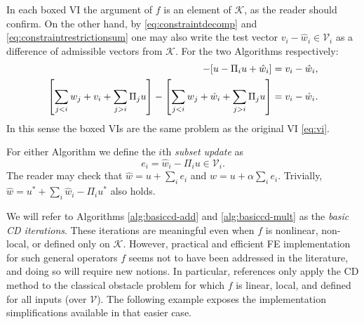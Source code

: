 \documentclass[letterpaper,final,12pt,reqno]{amsart}
\theoremstyle{cstyle}
\theoremstyle{cstyle*}
\theoremstyle{dstyle}
\numberwithin{equation}{section}
\numberwithin{figure}{section}
\numberwithin{table}{section}
\numberwithin{theorem}{section}
\newcommand{\cK}{\mathcal{K}}
\newcommand{\cV}{\mathcal{V}}
\begin{document}
In each boxed VI the argument of $f$ is an element of $\cK$, as the reader should confirm.  On the other hand, by \eqref{eq:constraintdecomp} and \eqref{eq:constraintrestrictionsum} one may also write the test vector $v_i - \hat w_i \in \cV_i$ as a difference of admissible vectors from $\cK$.  For the two Algorithms respectively:
\begin{align*}
[u - \Pi_i u + v_i] - [u - \Pi_i u + \hat w_i] &= v_i - \hat w_i, \label{eq:admissibledifference} \\
\left[\sum_{j<i} w_j + v_i + \sum_{j>i} \Pi_j u\right] - \left[\sum_{j<i} w_j + \hat w_i + \sum_{j>i} \Pi_j u\right] &= v_i - \hat w_i.  \notag
\end{align*}
In this sense the boxed VIs are the same problem as the original VI \eqref{eq:vi}.

For either Algorithm we define the $i$th \emph{subset update} as
\begin{equation}
e_i = \hat w_i - \Pi_i u \in \cV_i. \label{eq:ithupdate}
\end{equation}
The reader may check that $\hat w = u + \sum_{i} e_i$ and $w = u + \alpha \sum_i e_i$.  Trivially, $\hat w = u^* + \sum_i \hat w_i - \Pi_i u^*$ also holds.

We will refer to Algorithms \ref{alg:basiccd-add} and \ref{alg:basiccd-mult} as the \emph{basic CD iterations}.  These iterations are meaningful even when $f$ is nonlinear, non-local, or defined only on $\cK$.  However, practical and efficient FE implementation for such general operators $f$ seems not to have been addressed in the literature, and doing so will require new notions.  In particular, references \cite{GraeserKornhuber2009,Tai2003} only apply the CD method to the classical obstacle problem for which $f$ is linear, local, and defined for all inputs (over $\mathcal{V}$).  The following example exposes the implementation simplifications available in that easier case.
\end{document}
